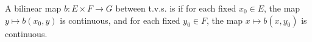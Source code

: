 A bilinear map $b: E \times F \rightarrow G$ between t.v.s. is  if for each fixed $x_0 \in E$, the map $y \mapsto b(x_0, y)$ is continuous, and for each fixed $y_0 \in F$, the map $x \mapsto b(x, y_0)$ is continuous.
